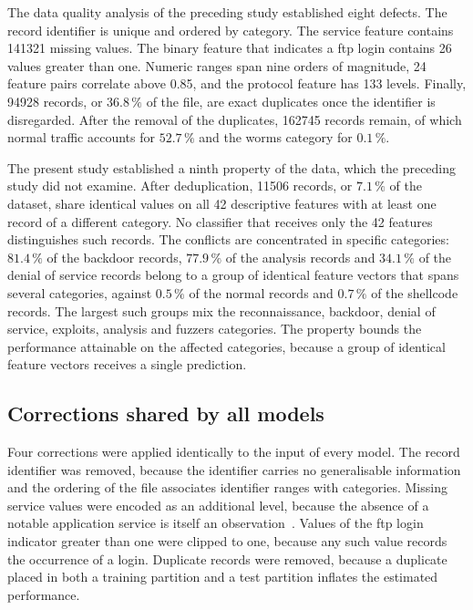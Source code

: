 The data quality analysis of the preceding study established eight defects.
The record identifier is unique and ordered by category. The service feature
contains \num{141321} missing values. The binary feature that indicates a
\gls{ftp} login contains 26 values greater than one. Numeric ranges span nine
orders of magnitude, 24 feature pairs correlate above 0.85, and the protocol
feature has 133 levels. Finally, \num{94928} records, or $36.8\,\%$ of the
file, are exact duplicates once the identifier is disregarded. After the
removal of the duplicates, \num{162745} records remain, of which normal
traffic accounts for $52.7\,\%$ and the worms category for $0.1\,\%$.

The present study established a ninth property of the data, which the
preceding study did not examine. After deduplication, \num{11506} records,
or $7.1\,\%$ of the dataset, share identical values on all 42 descriptive
features with at least one record of a different category. No classifier
that receives only the 42 features distinguishes such records. The conflicts
are concentrated in specific categories: $81.4\,\%$ of the backdoor records,
$77.9\,\%$ of the analysis records and $34.1\,\%$ of the denial of service
records belong to a group of identical feature vectors that spans several
categories, against $0.5\,\%$ of the normal records and $0.7\,\%$ of the
shellcode records. The largest such groups mix the reconnaissance,
backdoor, denial of service, exploits, analysis and fuzzers categories.
The property bounds the performance attainable on the affected categories,
because a group of identical feature vectors receives a single prediction.

\subsection{Corrections shared by all models}
\label{sec:shared}

Four corrections were applied identically to the input of every model. The
record identifier was removed, because the identifier carries no
generalisable information and the ordering of the file associates identifier
ranges with categories. Missing service values were encoded as an additional
level, because the absence of a notable application service is itself an
observation~\cite{moustafa2015}. Values of the \gls{ftp} login indicator greater
than one were clipped to one, because any such value records the occurrence
of a login. Duplicate records were removed, because a duplicate placed in
both a training partition and a test partition inflates the estimated
performance.

